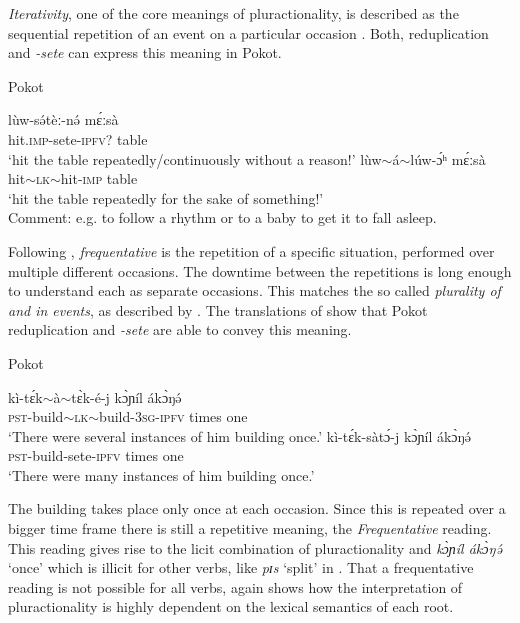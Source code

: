 \documentclass[output=paper,colorlinks,citecolor=brown
]{langscibook}
\begin{document}
\z



\textit{Iterativity}, one of the core meanings of pluractionality, is described as the sequential repetition of an event on a particular occasion \citep[22]{Mattiola2019}. Both, reduplication and \textit{-sete} can express this meaning in Pokot.  

\ea Pokot
\begin{xlist}
    
\ex 
\gll lùw-sə́tèː-nə́ mɛ́ːsà\\
hit.\textsc{imp}-sete-\textsc{ipfv}? table\\
\glt `hit the table repeatedly/continuously without a reason!'
\ex 
\gll lùw$\sim$á$\sim$lúw-ɔ́ʰ mɛ́ːsà\\
hit$\sim$\textsc{lk}$\sim$hit-\textsc{imp} table\\
\glt `hit the table repeatedly for the sake of something!'\\
Comment: e.g. to follow a rhythm or to a baby to get it to fall asleep.

\end{xlist}
\z




Following \citet[24]{Mattiola2019}, \textit{frequentative} is the repetition of a specific situation, performed over multiple different occasions. The downtime between the repetitions is long enough to understand each as separate occasions. This matches the so called \textit{plurality of and in events}, as described by \cite{Cusic81}. The translations of  show that Pokot reduplication and \textit{-sete} are able to convey this meaning. 

\ea Pokot \label{ex:fiebig:freq}
\begin{xlist}
\ex
\gll kì-tɛ́k$\sim$à$\sim$tɛ̀k-é-j kɔ̀ɲíl ákɔ̀ŋə́\\
\textsc{pst}-build$\sim$\textsc{lk}$\sim$build-\textsc{3sg-ipfv} times one\\
\glt `There were several instances of him building once.'
\ex
\gll kì-tɛ́k-sàtɔ́-j kɔ̀ɲíl ákɔ̀ŋə́\\
\textsc{pst}-build-sete-\textsc{ipfv} times one\\
\glt `There were many instances of him building once.'
\end{xlist}
\z

\noindent The building takes place only once at each occasion. Since this is repeated over a bigger time frame there is still a repetitive meaning, the \textit{Frequentative} reading. This reading gives rise to the licit combination of pluractionality and \textit{kɔ̀ɲíl ákɔ̀ŋə́} `once' which is illicit for other verbs, like \textit{pɪs} `split' in . That a frequentative reading is not possible for all verbs, again shows how the interpretation of pluractionality is highly dependent on the lexical semantics of each root.
\end{document}
